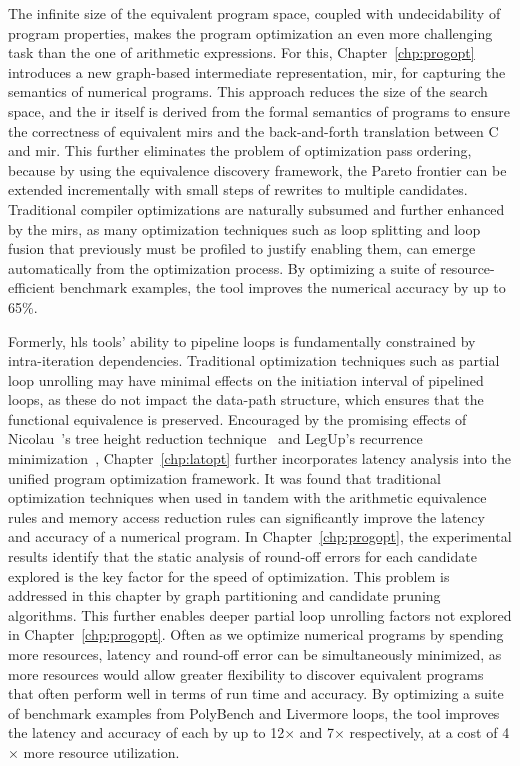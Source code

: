 The infinite size of the equivalent program space, coupled with undecidability
of program properties, makes the program optimization an even more
challenging task than the one of arithmetic expressions.  For this,
Chapter~\ref{chp:progopt} introduces a new graph-based intermediate
representation, \gls{mir}, for capturing the semantics of numerical programs.
This approach reduces the size of the search space, and the \gls{ir} itself
is derived from the formal semantics of programs to ensure the correctness
of equivalent \glspl{mir} and the back-and-forth translation between C and
\gls{mir}\@.  This further eliminates the problem of optimization pass
ordering, because by using the equivalence discovery framework, the Pareto
frontier can be extended incrementally with small steps of rewrites to multiple
candidates.  Traditional compiler optimizations are naturally subsumed and
further enhanced by the \glspl{mir}, as many optimization techniques such as
loop splitting and loop fusion that previously must be profiled to justify
enabling them, can emerge automatically from the optimization process.  By
optimizing a suite of resource-efficient benchmark examples, the tool improves
the numerical accuracy by up to 65\%.

Formerly, \gls{hls} tools' ability to pipeline loops is fundamentally
constrained by intra-iteration dependencies.  Traditional optimization
techniques such as partial loop unrolling may have minimal effects on the
initiation interval of pipelined loops, as these do not impact the data-path
structure, which ensures that the functional equivalence is preserved.
Encouraged by the promising effects of Nicolau~\etal's tree height reduction
technique~\cite{nicolau91} and LegUp's recurrence minimization~\cite{canis14},
Chapter~\ref{chp:latopt} further incorporates latency analysis into the unified
program optimization framework.  It was found that traditional optimization
techniques when used in tandem with the arithmetic equivalence rules and memory
access reduction rules can significantly improve the latency and accuracy of
a numerical program.  In Chapter~\ref{chp:progopt}, the experimental results
identify that the static analysis of round-off errors for each candidate
explored is the key factor for the speed of optimization.  This problem
is addressed in this chapter by graph partitioning and candidate pruning
algorithms.  This further enables deeper partial loop unrolling factors not
explored in Chapter~\ref{chp:progopt}.  Often as we optimize numerical programs
by spending more resources, latency and round-off error can be simultaneously
minimized, as more resources would allow greater flexibility to discover
equivalent programs that often perform well in terms of run time and accuracy.
By optimizing a suite of benchmark examples from PolyBench and Livermore loops,
the tool improves the latency and accuracy of each by up to 12$\times$ and
7$\times$ respectively, at a cost of 4$\times$ more resource utilization.


